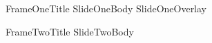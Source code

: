 \documentclass{beamer}
\begin{document}
\begin{frame}{FrameOneTitle}
SlideOneBody \pause SlideOneOverlay
\end{frame}
\begin{frame}{FrameTwoTitle}
SlideTwoBody
\end{frame}
\end{document}
